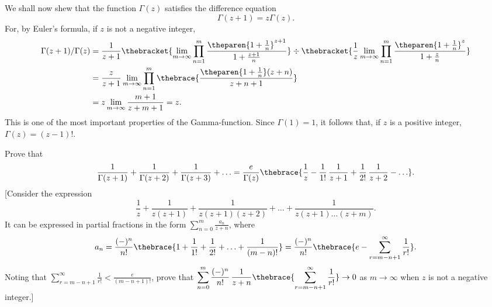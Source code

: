  We shall
now shew that the function $\Gamma(z)$ satisfies the difference
equation
\begin{displaymath}
  \Gamma(z + 1) = z \Gamma(z) .
\end{displaymath}
For, by Euler's formula, if $z$ is not a negative integer,
\begin{align*}
\Gamma(z + 1)/\Gamma(z) 
  &= 
    \frac{1}{z+1} \thebracket{\lim_{m \rightarrow \infty}
    \prod_{n=1}^{m} \frac{\theparen{1 + \frac{1}{n}}^{z+1}}{
    1 + \frac{z+1}{n}} }
    \div
    \thebracket{ \frac{1}{z} \lim_{m \rightarrow \infty}
    \prod_{n=1}^{m} \frac{\theparen{1 + \frac{1}{n}}^{z}}{
    1 + \frac{z}{n}} } \\
  &= 
    \frac{z}{z+1} \lim_{m \rightarrow \infty} \prod_{n=1}^{m} 
    \thebrace{\frac{\theparen{1 + \frac{1}{n}}(z+n)}{z + n + 1}} \\
  &= 
    z \lim_{m \rightarrow \infty} \frac{m+1}{z + m + 1} = z .
\end{align*}
This is one of the most important properties of the Gamma-function.
Since $\Gamma(1) = 1$, it follows that, if $z$ is a positive integer, 
$\Gamma(z) = (z - 1)!$.

%
%

\begin{wandwexample*}
  Prove that
  \begin{displaymath}
    \frac{1}{\Gamma(z+1)} + \frac{1}{\Gamma(z+2)} +
    \frac{1}{\Gamma(z+3)} +  \ldots =
    \frac{e}{\Gamma(z)} \thebrace{\frac{1}{z} - 
      \frac{1}{1!} \, \frac{1}{z + 1} + 
      \frac{1}{2!} \, \frac{1}{z + 2} 
      - \ldots } .
  \end{displaymath}
  [Consider the expression
  \begin{displaymath}
    \frac{1}{z} + \frac{1}{z(z + 1)} + 
    \frac{1}{z(z + 1)(z + 2)} + \ldots + 
    \frac{1}{z(z + 1) \ldots (z + m)} .
  \end{displaymath}
  It can be expressed in partial fractions in the form 
  $\displaystyle \sum_{n=0}^m \frac{a_n}{z + n}$, where
  \begin{displaymath}
    a_n = \frac{(-)^n}{n!} \thebrace{
      1 + \frac{1}{1!} + \frac{1}{2!} + \ldots +
      \frac{1}{(m - n)!}
    } =
    \frac{(-)^n}{n!} \thebrace{
      e - \sum_{r = m - n + 1}^\infty \frac{1}{r!}
    } .
  \end{displaymath}
  Noting that 
  $\displaystyle \sum_{r = m - n + 1}^\infty \frac{1}{r!} 
  < \frac{e}{(m-n+1)!}$, 
  prove that $\displaystyle \sum_{n=0}^m \frac{(-)^n}{n!} \, 
  \frac{1}{z+n}
  \thebrace{\sum_{r = m - n + 1}^\infty \frac{1}{r!}} 
  \rightarrow 0$ as
  $m \rightarrow \infty$ when $z$ is not a negative integer.]
\end{wandwexample*}


